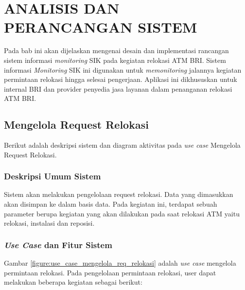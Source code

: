 \chapter{ANALISIS DAN PERANCANGAN SISTEM}
\tab Pada bab ini akan dijelaskan mengenai desain dan implementasi rancangan sistem informasi \textit{monitoring} SIK pada kegiatan relokasi ATM BRI. Sistem informasi \textit{Monitoring} SIK ini digunakan untuk \textit{memonitoring} jalannya kegiatan permintaan relokasi hingga selesai pengerjaan. Aplikasi ini dikhususkan untuk internal BRI dan provider penyedia jasa layanan dalam penanganan relokasi ATM BRI.

\section{Mengelola Request Relokasi}
Berikut adalah deskripsi sistem dan diagram aktivitas pada \textit{use case} Mengelola Request Relokasi. 
\subsection{Deskripsi Umum Sistem}
\tab Sistem akan melakukan pengelolaan request relokasi. Data yang dimasukkan akan disimpan ke dalam basis data. Pada kegiatan ini, terdapat sebuah parameter berupa kegiatan yang akan dilakukan pada saat relokasi ATM yaitu relokasi, instalasi dan reposisi.
\subsection{\textit{Use Case} dan Fitur Sistem}
Gambar \ref{figure:use_case_mengelola_req_relokasi} adalah \textit{use case} mengelola permintaan relokasi. Pada pengelolaan permintaan relokasi, user dapat melakukan beberapa kegiatan sebagai berikut:
